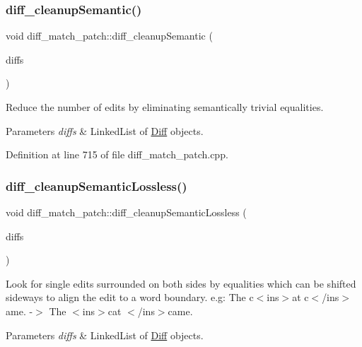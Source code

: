 \subsubsection{\texorpdfstring{diff\+\_\+cleanup\+Semantic()}{diff\_cleanupSemantic()}}
{\footnotesize\ttfamily void diff\+\_\+match\+\_\+patch\+::diff\+\_\+cleanup\+Semantic (\begin{DoxyParamCaption}\item[{Q\+List$<$ \hyperlink{class_diff}{Diff} $>$ \&}]{diffs }\end{DoxyParamCaption})}

Reduce the number of edits by eliminating semantically trivial equalities. 
\begin{DoxyParams}{Parameters}
{\em diffs} & Linked\+List of \hyperlink{class_diff}{Diff} objects. \\
\hline
\end{DoxyParams}


Definition at line 715 of file diff\+\_\+match\+\_\+patch.\+cpp.

\mbox{\label{classdiff__match__patch_afd96870070c1dc460d1c261fa3f0f485}} 
\subsubsection{\texorpdfstring{diff\+\_\+cleanup\+Semantic\+Lossless()}{diff\_cleanupSemanticLossless()}}
{\footnotesize\ttfamily void diff\+\_\+match\+\_\+patch\+::diff\+\_\+cleanup\+Semantic\+Lossless (\begin{DoxyParamCaption}\item[{Q\+List$<$ \hyperlink{class_diff}{Diff} $>$ \&}]{diffs }\end{DoxyParamCaption})}

Look for single edits surrounded on both sides by equalities which can be shifted sideways to align the edit to a word boundary. e.\+g\+: The c$<$ins$>$at c$<$/ins$>$ame. -\/$>$ The $<$ins$>$cat $<$/ins$>$came. 
\begin{DoxyParams}{Parameters}
{\em diffs} & Linked\+List of \hyperlink{class_diff}{Diff} objects. \\
\hline
\end{DoxyParams}


